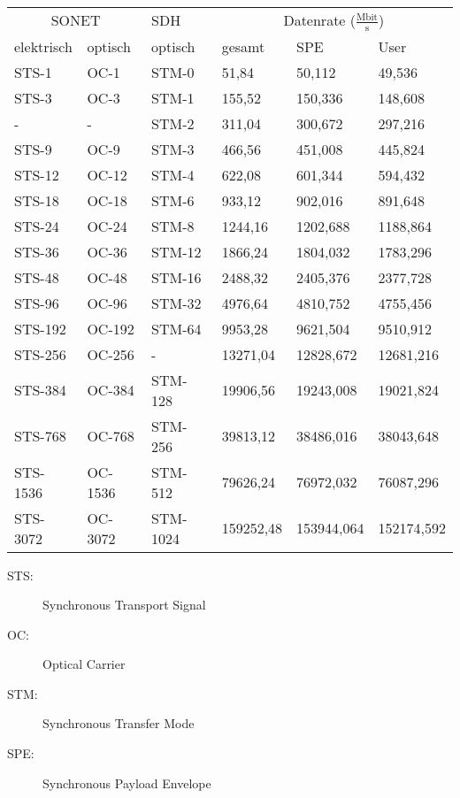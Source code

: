\documentclass[a4paper]{article}
\begin{document}
\begin{tabular}{|ll|l|lll|}
    \hline
    \multicolumn{2}{|c|}{SONET} & SDH & \multicolumn{3}{|c|}{Datenrate ($\frac{\text{Mbit}}{\text{s}}$)}\\
    elektrisch & optisch & optisch & gesamt & SPE & User\\
    \hline
    STS-1 & OC-1 & STM-0 & 51,84 & 50,112 & 49,536 \\
    STS-3 & OC-3 & STM-1 & 155,52 & 150,336 & 148,608 \\
    - & - & STM-2 & 311,04 & 300,672 & 297,216 \\
    STS-9 & OC-9 & STM-3 & 466,56 & 451,008 & 445,824 \\
    STS-12 & OC-12 & STM-4 & 622,08 & 601,344 & 594,432 \\
    STS-18 & OC-18 & STM-6 & 933,12 & 902,016 & 891,648 \\
    STS-24 & OC-24 & STM-8 & 1244,16 & 1202,688 & 1188,864 \\
    STS-36 & OC-36 & STM-12 & 1866,24 & 1804,032 & 1783,296 \\
    STS-48 & OC-48 & STM-16 & 2488,32 & 2405,376 & 2377,728 \\
    STS-96 & OC-96 & STM-32 & 4976,64 & 4810,752 & 4755,456 \\
    STS-192 & OC-192 & STM-64 & 9953,28 & 9621,504 & 9510,912 \\
    STS-256 & OC-256 & - & 13271,04 & 12828,672 & 12681,216 \\
    STS-384 & OC-384 & STM-128 & 19906,56 & 19243,008 & 19021,824 \\
    STS-768 & OC-768 & STM-256 & 39813,12 & 38486,016 & 38043,648 \\
    STS-1536 & OC-1536 & STM-512 & 79626,24 & 76972,032 & 76087,296 \\
    STS-3072 & OC-3072 & STM-1024 & 159252,48 & 153944,064 & 152174,592\\
    \hline
\end{tabular}

\vspace{5mm}
\begin{minipage}{0.45\textwidth}
    \begin{description}
        \item[STS:] Synchronous Transport Signal
        \item[OC:] Optical Carrier
    \end{description}
\end{minipage}
\begin{minipage}{0.1\textwidth}
    \hfill
\end{minipage}
\begin{minipage}{0.45\textwidth}
    \begin{description}
        \item[STM:] Synchronous Transfer Mode
        \item[SPE:] Synchronous Payload Envelope
    \end{description}
\end{minipage}
\end{document}
